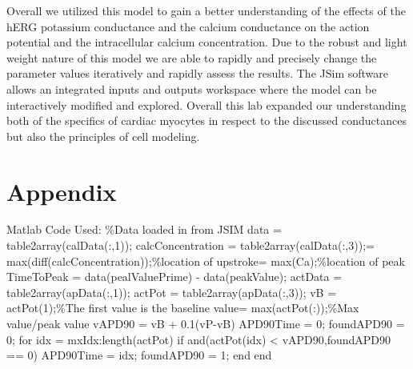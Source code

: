 \documentclass[11pt]{article}
\begin{document}
\par{}
Overall we utilized this model to gain a better understanding of the effects of the hERG potassium conductance and the calcium conductance on the action potential and the intracellular calcium concentration. Due to the robust and light weight nature of this model we are able to rapidly and precisely change the parameter values iteratively and rapidly assess the results. The JSim software allows an integrated inputs and outputs workspace where the model can be interactively modified and explored. Overall this lab expanded our understanding both of the specifics of cardiac myocytes in respect to the discussed conductances but also the principles of cell modeling.








\section{Appendix} 
Matlab Code Used:\newline
\%Data loaded in from JSIM\newline
data = table2array(calData(:,1)); \newline
calcConcentration = table2array(calData(:,3)); = max(diff(calcConcentration));\%location of upstroke = max(Ca);\%location of peak\newline
TimeToPeak = data(pealValuePrime) - data(peakValue); \newline
\newline
actData = table2array(apData(:,1));
actPot = table2array(apData(:,3));
vB = actPot(1);\%The first value is the baseline value\newline
[vP,mxIdx] = max(actPot(:));\%Max value/peak value\newline
vAPD90 = vB + 0.1(vP-vB)\newline
APD90Time = 0;\newline
foundAPD90 = 0;
for idx = mxIdx:length(actPot)\newline
if and(actPot(idx) < vAPD90,foundAPD90 == 0)\newline
APD90Time = idx;\newline
foundAPD90 = 1;\newline
end\newline
end\newline
\end{document}
